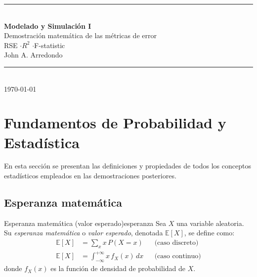 \documentclass[12pt, a4paper]{article}
\newcommand{\E}[1]{\mathbb{E}\!\left[#1\right]}
\begin{document}

\begin{titlepage}
  \centering
  \vspace*{2cm}
  {\color{azuloscuro}\rule{\linewidth}{2pt}}\\[0.4cm]
  {\Huge\bfseries\color{azuloscuro}
    Modelado y Simulación I}\\[0.3cm]
  {\Large\color{azulmedio}
    Demostración matemática de las métricas de error}\\[0.15cm]
  {\large\color{azulmedio}
    RSE \quad$\cdot$\quad $R^2$ \quad$\cdot$\quad F-statistic}\\[0.4cm]
  {\large\color{azulmedio}
   John A. Arredondo}\\[0.4cm]
  {\color{azuloscuro}\rule{\linewidth}{2pt}}\\[1.5cm]
  \vfill
  {\small\color{gray}\today}
\end{titlepage}

\tableofcontents
\newpage

\section{Fundamentos de Probabilidad y Estadística}

En esta sección se presentan las definiciones y propiedades de todos los
conceptos estadísticos empleados en las demostraciones posteriores.

\subsection{Esperanza matemática}

\begin{definicion}{Esperanza matemática (valor esperado)}{esperanza}
Sea $X$ una variable aleatoria. Su \emph{esperanza matemática} o
\emph{valor esperado}, denotada $\E{X}$, se define como:
\begin{align*}
  \E{X} &= \sum_{x} x\, P(X = x)
    && \text{(caso discreto)}\\[4pt]
  \E{X} &= \int_{-\infty}^{+\infty} x\, f_X(x)\,dx
    && \text{(caso continuo)}
\end{align*}
donde $f_X(x)$ es la función de densidad de probabilidad de $X$.
\end{definicion}
\end{document}
